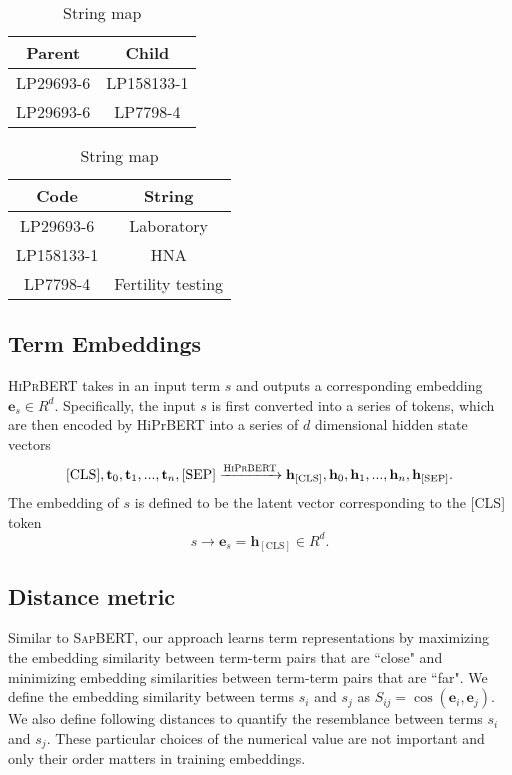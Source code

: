 \documentclass[12pt,a4paper]{cibb}
\begin{document}
\begin{table}[ht]
\parbox{.45\linewidth}{
\centering
\caption{Hierarchy map}
\begin{tabular}{cc}
Parent & Child \\
\hline
LP29693-6 & LP158133-1 \\
LP29693-6 & LP7798-4 \\
\end{tabular}
}
\hfill
\parbox{.45\linewidth}{
\centering
\caption{String map}
\begin{tabular}{cc}
Code & String \\
\hline
LP29693-6 & Laboratory \\
LP158133-1 & HNA \\
LP7798-4   & Fertility testing 
\end{tabular}
}
\end{table}

\subsection{Term Embeddings}
\textsc{HiPrBERT} takes in an input term $s$ and outputs a corresponding embedding $\textbf{e}_s\in R^d$. Specifically, the input $s$ is first converted into a series of tokens, which are then encoded by HiPrBERT into a series of $d$ dimensional hidden state vectors
$$[\text{CLS}], \mathbf{t}_0, \mathbf{t}_1, ..., \mathbf{t}_n, [\text{SEP}] \xrightarrow{\textsc{HiPrBERT}}  \mathbf{h}_{[\text{CLS}]}, \mathbf{h}_0, \mathbf{h}_1, ..., \mathbf{h}_n, \mathbf{h}_{[\text{SEP}]}.$$
The embedding of $s$ is defined to be the latent vector corresponding to the [CLS] token
$$s\rightarrow \mathbf{e}_s = \mathbf{h}_{[\text{CLS}]}\in R^d.$$




\subsection{Distance metric}
Similar to \textsc{SapBERT}, our approach learns term representations by maximizing the embedding similarity between term-term pairs that are ``close" and minimizing embedding similarities between term-term pairs that are ``far". We define the embedding similarity between terms $s_i$ and $s_j$ as $S_{ij} = \cos(\mathbf{e}_i, \mathbf{e}_j).$ We also define following distances to quantify the resemblance between terms $s_i$ and $s_j.$ These particular choices of the numerical value are not important and only their order matters in training embeddings.  
\end{document}
